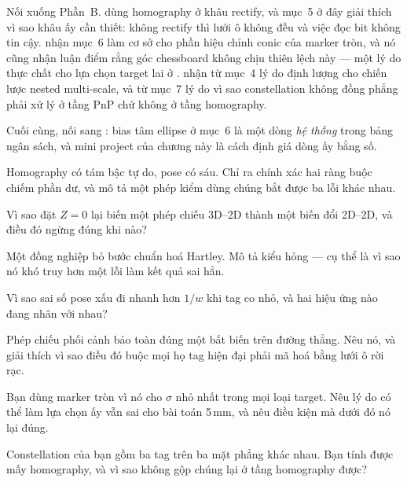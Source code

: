 \documentclass[../../marker.tex]{subfiles}
\begin{document}
Nối xuống Phần~B.  dùng homography ở khâu rectify, và mục~5 ở đây giải thích vì sao khâu ấy cần thiết: không rectify thì lưới ô không đều và việc đọc bit không tin cậy.  nhận mục~6 làm cơ sở cho phần hiệu chỉnh conic của marker tròn, và nó cũng nhận luận điểm rằng góc chessboard không chịu thiên lệch này --- một lý do thực chất cho lựa chọn target lai ở .  nhận từ mục~4 lý do định lượng cho chiến lược nested multi-scale, và từ mục~7 lý do vì sao constellation không đồng phẳng phải xử lý ở tầng PnP chứ không ở tầng homography.

Cuối cùng, nối sang : bias tâm ellipse ở mục~6 là một dòng \emph{hệ thống} trong bảng ngân sách, và mini project của chương này là cách định giá dòng ấy bằng số.

\begin{tukiem}
\item Homography có tám bậc tự do, pose có sáu. Chỉ ra chính xác hai ràng buộc chiếm phần dư, và mô tả một phép kiểm dùng chúng bắt được ba lỗi khác nhau.
\item Vì sao đặt \(Z = 0\) lại biến một phép chiếu 3D--2D thành một biến đổi 2D--2D, và điều đó ngừng đúng khi nào?
\item Một đồng nghiệp bỏ bước chuẩn hoá Hartley. Mô tả kiểu hỏng --- cụ thể là vì sao nó khó truy hơn một lỗi làm kết quả sai hẳn.
\item Vì sao sai số pose xấu đi nhanh hơn \(1/w\) khi tag co nhỏ, và hai hiệu ứng nào đang nhân với nhau?
\item Phép chiếu phối cảnh bảo toàn đúng một bất biến trên đường thẳng. Nêu nó, và giải thích vì sao điều đó buộc mọi họ tag hiện đại phải mã hoá bằng lưới ô rời rạc.
\item Bạn dùng marker tròn vì nó cho \(\sigma\) nhỏ nhất trong mọi loại target. Nêu lý do có thể làm lựa chọn ấy vẫn sai cho bài toán 5\,mm, và nêu điều kiện mà dưới đó nó lại đúng.
\item Constellation của bạn gồm ba tag trên ba mặt phẳng khác nhau. Bạn tính được mấy homography, và vì sao không gộp chúng lại ở tầng homography được?
\end{tukiem}
\ifSubfilesClassLoaded{\printbibliography[title={Nguồn}]}{}
\end{document}

